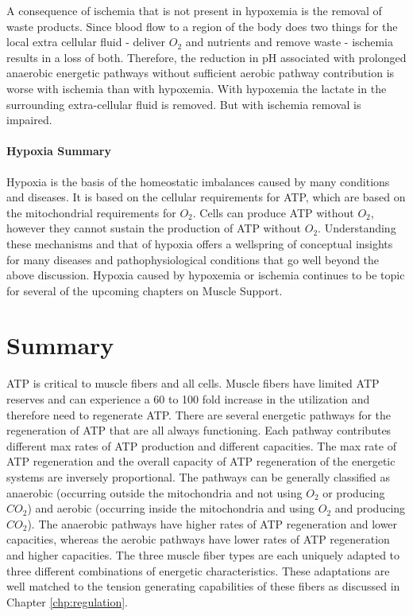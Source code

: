 A consequence of ischemia that is not present in hypoxemia is the removal of waste products. Since blood flow to a region of the body does two things for the local extra cellular fluid - deliver $O_2$ and nutrients and remove waste - ischemia results in a loss of both. Therefore, the reduction in pH associated with prolonged anaerobic energetic pathways without sufficient aerobic pathway contribution is worse with ischemia than with hypoxemia. With hypoxemia the lactate in the surrounding extra-cellular fluid is removed. But with ischemia removal is impaired. 

\paragraph{Hypoxia Summary}
Hypoxia is the basis of the homeostatic imbalances caused by many conditions and diseases. It is based on the cellular requirements for ATP, which are based on the mitochondrial requirements for $O_2$. Cells can produce ATP without $O_2$, however they cannot sustain the production of ATP without $O_2$. Understanding these mechanisms and that of hypoxia offers a wellspring of conceptual insights for many diseases and pathophysiological conditions that go well beyond the above discussion. Hypoxia caused by hypoxemia or ischemia continues to be topic for several of the upcoming chapters on Muscle Support.

\section{Summary}

ATP is critical to muscle fibers and all cells. Muscle fibers have limited ATP reserves and can experience a 60 to 100 fold increase in the utilization and therefore need to regenerate ATP. There are several energetic pathways for the regeneration of ATP that are all always functioning.  Each pathway contributes different max rates of ATP production and different capacities. The max rate of ATP regeneration and the overall capacity of ATP regeneration of the energetic systems are inversely proportional. The pathways can be generally classified as anaerobic (occurring outside the mitochondria and not using $O_2$ or producing $CO_2$) and aerobic (occurring inside the mitochondria and using $O_2$ and producing $CO_2$). The anaerobic pathways have higher rates of ATP regeneration and lower capacities, whereas the aerobic pathways have lower rates of ATP regeneration and higher capacities. The three muscle fiber types are each uniquely adapted to three different combinations of energetic characteristics. These adaptations are well matched to the tension generating capabilities of these fibers as discussed in Chapter \ref{chp:regulation}. 

